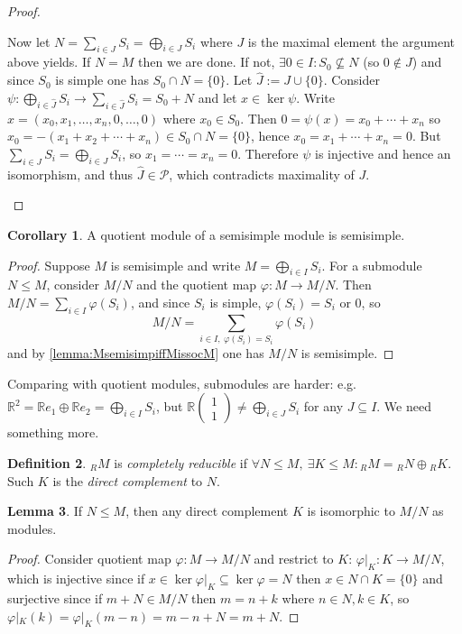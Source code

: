 \documentclass[a4paper]{article}
\newcommand{\R}{\mathbb{R}}
\theoremstyle{definition}
\newtheorem{defn}{Definition}[subsection]
\newtheorem{lemma}[defn]{Lemma}
\newtheorem{coro}[defn]{Corollary}
\begin{document}
\begin{proof}
\begin{enumerate}
Now let $N=\sum_{i\in J}S_i=\bigoplus_{i\in J}S_i$ where $J$ is the maximal element the argument above yields. If $N=M$ then we are done. If not, $\exists 0\in I:S_0\not\subseteq N$ (so $0\notin J$) and since $S_0$ is simple one has $S_0\cap N=\{0\}$. Let $\widehat J:=J\cup\{0\}$. Consider $\psi:\bigoplus_{i\in\widehat J}S_i\rightarrow \sum_{i\in \widehat J} S_i=S_0+N$ and let $x\in\ker\psi$. Write $x=(x_0,x_1,\ldots,x_n,0,\ldots,0)$ where $x_0\in S_0$. Then $0=\psi(x)=x_0+\cdots+x_n$ so $x_0=-(x_1+x_2+\cdots+x_n)\in S_0\cap N=\{0\}$, hence $x_0=x_1+\cdots+x_n=0$. But $\sum_{i\in J}S_i=\bigoplus_{i\in J}S_i$, so $x_1=\cdots=x_n=0$. Therefore $\psi$ is injective and hence an isomorphism, and thus $\widehat J\in\mathcal P$, which contradicts maximality of $J$.
\end{enumerate}
\end{proof}

\begin{coro}
\label{coro:quoofsemisimpissemisimp}
A quotient module of a semisimple module is semisimple.
\end{coro}
\begin{proof}
Suppose $M$ is semisimple and write $M=\bigoplus_{i\in I}S_i$. For a submodule $N\leq M$, consider $M/N$ and the quotient map $\varphi:M\rightarrow M/N$. Then $M/N=\sum_{i\in I}\varphi(S_i)$, and since $S_i$ is simple, $\varphi(S_i)=S_i$ or 0, so
\[
M/N=\sum_{i\in I,\ \varphi(S_i)=S_i}\varphi(S_i)
\]
and by \ref{lemma:MsemisimpiffMissocM} one has $M/N$ is semisimple.
\end{proof}
Comparing with quotient modules, submodules are harder: e.g. $\R^2=\R e_1\oplus \R e_2=\bigoplus_{i\in I} S_i$, but $\R\begin{pmatrix}1\\1\end{pmatrix}\neq\bigoplus_{i\in J}S_i$ for any $J\subseteq I$. We need something more.

\begin{defn}
$_RM$ is \textit{completely reducible} if $\forall N\leq M,\ \exists K\leq M:{}_RM={}_RN\oplus{}_RK$. Such $K$ is the \textit{direct complement} to $N$.
\end{defn}
\begin{lemma}
If $N\leq M$, then any direct complement $K$ is isomorphic to $M/N$ as modules.
\end{lemma}
\begin{proof}
Consider quotient map $\varphi:M\rightarrow M/N$ and restrict to $K$: $\varphi|_K:K\rightarrow M/N$, which is injective since if $x\in\ker\varphi|_K\subseteq\ker\varphi=N$ then $x\in N\cap K=\{0\}$ and surjective since if $m+N\in M/N$ then $m=n+k$ where $n\in N,k\in K$, so $\varphi|_K(k)=\varphi|_K(m-n)=m-n+N=m+N$.
\end{proof}
\end{document}
